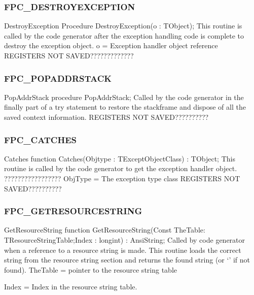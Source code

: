 \documentclass [12pt]{article}
\begin{document}
\subsubsection{FPC{\_}DESTROYEXCEPTION}
\label{subsubsec:mylabel65}

\begin{procedure}{DestroyException}
\Declaration
Procedure DestroyException(o : TObject);
\Description 
This routine is called by the code generator after the exception handling
code is complete to destroy the exception object.
\Parameters  
o = Exception handler object reference 
\Notes 
REGISTERS NOT SAVED????????????? 
\end{procedure}

\subsubsection{FPC{\_}POPADDRSTACK}
\label{subsubsec:mylabel66}

\begin{procedure}{PopAddrStack}
\Declaration
procedure PopAddrStack;
\Description 
Called by the code generator in the finally part of a try statement to
restore the stackframe and dispose of all the saved context information.
\Notes 
REGISTERS NOT SAVED?????????? 
\end{procedure}

\subsubsection{FPC{\_}CATCHES}
\label{subsubsec:mylabel67}

\begin{function}{Catches}
\Declaration
function Catches(Objtype : TExceptObjectClass) : TObject;
\Description 
This routine is called by the code generator to get the exception handler
object. ?????????????????
\Parameters 
ObjType = The exception type class 
\Notes 
REGISTERS NOT SAVED?????????? 
\end{function}

\subsubsection{FPC{\_}GETRESOURCESTRING}
\label{subsubsec:mylabel68}

\begin{function}{GetResourceString}
\Declaration
function GetResourceString(Const TheTable: TResourceStringTable;Index : longint) : AnsiString;
\Description 
Called by code generator when a reference to a resource string is made. This
routine loads the correct string from the resource string section and
returns the found string (or `' if not found).
\Parameters 
TheTable = pointer to the resource string table \par
Index = Index in the resource string table. 
\end{function}
\end{document}
